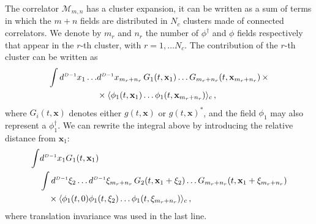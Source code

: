 \noindent
The correlator $\mathcal{M}_{m,n}$ has a cluster expansion, \ie it
can be written as a sum of terms in which the $m+n$ fields are distributed in
$N_c$ clusters made of connected correlators. We denote by $m_r$ and $n_r$ the
number of $\phi^\dagger$ and $\phi$ fields respectively that appear in the
$r$-th cluster, with $r=1, \ldots N_c$. The contribution of the $r$-th cluster
can be written as
\begin{align}
    \label{eq:RthClusterContrib}
    \int d^{\scriptscriptstyle{D-1}}x_1 \ldots &d^{\scriptscriptstyle{D-1}}x_{m_r+n_r}\, G_1(t,\mathbf{x}_1)
      \ldots G_{m_r+n_r}(t,\mathbf{x}_{m_r+n_r})\, \times \nonumber \\
        &\times \langle \phi_{1}(t,\mathbf{x}_1) \ldots 
            \phi_{1}(t,\mathbf{x}_{m_r+n_r})
        \rangle_c \, ,
\end{align}
where $G_i(t,\mathbf{x})$ denotes either $g(t,\mathbf{x})$ or
$g(t,\mathbf{x})^*$, and the field $\phi_{1}$ may also represent a
$\phi_{1}^\dagger$. We can rewrite the integral above by introducing the
relative distance from $\mathbf{x}_1$:
\begin{equation}
    \label{eq:ShiftedClusterIntegral}
    \begin{split}
        \int & d^{\scriptscriptstyle{D-1}}x_1 G_1(t,\mathbf{x}_1) \, \\
        &\int d^{\scriptscriptstyle{D-1}}\xi_2 
            \ldots d^{\scriptscriptstyle{D-1}}\xi_{m_r+n_r}\, 
            G_2(t,\mathbf{x}_1+\mathbf{\xi}_2) 
            \ldots G_{m_r+n_r}(t,\mathbf{x}_1+\mathbf{\xi}_{m_r+n_r}) 
        \\
        & \quad \times \langle\phi_{1}(t,0) \phi_{1}(t,\mathbf{\xi}_2) \ldots 
        \phi_{1}(t,\mathbf{\xi}_{m_r+n_r}) \rangle_c\, , 
    \end{split}
\end{equation}
where translation invariance was used in the last line. 

